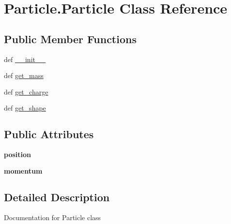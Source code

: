 \hypertarget{classParticle_1_1Particle}{\section{Particle.\-Particle Class Reference}
\label{classParticle_1_1Particle}
}
\subsection*{Public Member Functions}
\begin{DoxyCompactItemize}
\item 
def \hyperlink{classParticle_1_1Particle_a77dd3c2a4e855b0c3759d59d076afaec}{\-\_\-\-\_\-init\-\_\-\-\_\-}
\item 
def \hyperlink{classParticle_1_1Particle_a0fad0e3f522070b2205e700cd988e8e1}{get\-\_\-mass}
\item 
def \hyperlink{classParticle_1_1Particle_aa5ef82146506a18db92f83085ca612ef}{get\-\_\-charge}
\item 
def \hyperlink{classParticle_1_1Particle_a08f47667ea130e9e0ec09b0163012ded}{get\-\_\-shape}
\end{DoxyCompactItemize}
\subsection*{Public Attributes}
\begin{DoxyCompactItemize}
\item 
\hypertarget{classParticle_1_1Particle_ab1902e2ac809d2403182c9d0cb10c220}{{\bfseries position}}\label{classParticle_1_1Particle_ab1902e2ac809d2403182c9d0cb10c220}

\item 
\hypertarget{classParticle_1_1Particle_a16f2e7babf39bbbfb9c2351b1c33a57c}{{\bfseries momentum}}\label{classParticle_1_1Particle_a16f2e7babf39bbbfb9c2351b1c33a57c}

\end{DoxyCompactItemize}


\subsection{Detailed Description}
\begin{DoxyVerb}Documentation for Particle class
\end{DoxyVerb}
 

